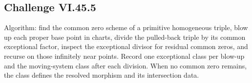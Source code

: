 \subsection*{Challenge VI.45.5}
\begin{solution}
Algorithm: find the common zero scheme of a primitive homogeneous triple, blow up each proper base point in charts, divide the pulled-back triple by its common exceptional factor, inspect the exceptional divisor for residual common zeros, and recurse on those infinitely near points.  Record one exceptional class per blow-up and the moving-system class after each division.  When no common zero remains, the class defines the resolved morphism and its intersection data.
\end{solution}

